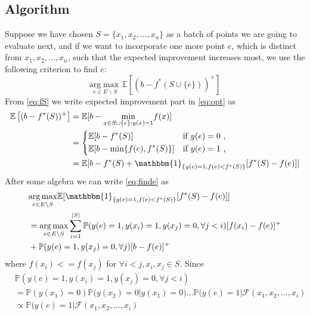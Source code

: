 \documentclass[12pt]{article}
\newcommand{\E}{\mathbb{E}}
\begin{document}
\subsection{Algorithm}
Suppose we have chosen $S=\{x_1, x_2, \ldots, x_n\}$ as a batch of points we are going to evaluate next, and if we want to incorporate one more point $e$, which is distinct from $x_1, x_2, \ldots, x_n$, such that the expected improvement increases most, we use the following criterion to find $e$:
\begin{equation} \label{eq:finde}
\underset{e \in E \backslash S}{\mathrm{arg}\max} \, \E \left[ (b-f^*(S \cup \{e\}))^+ \right]
\end{equation}
From \eqref{eq:fS} we write expected improvement part in \eqref{eq:opt} as
\begin{align*}
\E \left[ (b-f^*(S))^+ \right] &= \E [b-\underset{x \in S \cup \{e\}:y(x)=1}{\min} f(x)] \\
                  &=
                  \begin{dcases}
                    \E [b- f^*(S)] & \text{if $y(e)=0$ ,} \\
                    \E [b- \min \{f(e), f^*(S)\}]       & \text{if $y(e)=1$ ,}
                    \end{dcases} \\
                  &= \E [b-f^*(S) + \mathbbm{1}_{\{y(e)=1, f(e) < f^*(S)\}} [f^*(S)-f(e)] ]
\end{align*}
After some algebra we can write \eqref{eq:finde} as
\begin{align*}
&\underset{e \in E \backslash S}{\mathrm{arg}\max} \E [ \mathbbm{1}_{\{y(e)=1, f(e) < f^*(S)\}} [f^*(S)-f(e)] ] \\
&= \underset{e \in E \backslash S}{\mathrm{arg}\max} \sum_{i=1}^{|S|} \mathbb{P} (y(e)=1, y(x_i)=1, y(x_j)=0, \forall j <i) [f(x_i)-f(e)]^+ \\
&+ \mathbb{P} (y(e)=1, y(x_j)=0, \forall j) [b-f(e)]^+
\end{align*}
where $f(x_i)<=f(x_j)$ for $\forall i<j, x_i,x_j \in S$.
Since
\begin{align*}
&\mathbb{P} (y(e)=1, y(x_i)=1, y(x_j)=0, \forall j <i)\\
&= \mathbb{P}(y(x_1)=0) \mathbb{P}(y(x_2)=0|y(x_1)=0) \ldots \mathbb{P}(y(e)=1|\mathcal{F}(x_1,x_2,\ldots,x_i)\\
&\propto \mathbb{P}(y(e)=1|\mathcal{F}(x_1,x_2,\ldots,x_i)
\end{align*}
\end{document}
